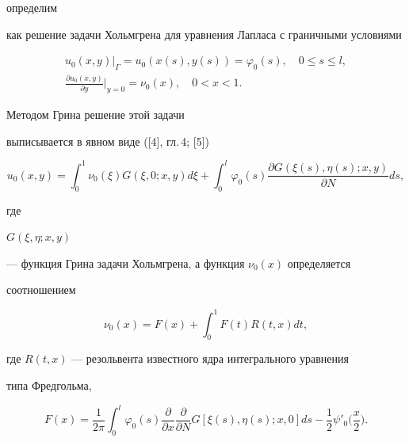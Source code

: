 определим


как решение задачи Хольмгрена для уравнения Лапласа с граничными условиями


\begin{gather*}


u_0(x,y)\big|_\Gamma=u_0(x(s),y(s))=


\varphi_0(s),\quad 0\le s\le l, \\


%


\frac {\partial u_0(x,y)}{\partial y}\bigg|_{y=0}


=\nu_0(x),\quad 0<x<1.


\end{gather*}


Методом Грина решение этой задачи


выписывается в явном виде ([4], гл.\,4; [5])


\begin{equation}


u_0(x,y)=\int_0^1\nu_0(\xi )G(\xi,0;x,y)d\xi +


\int_0^l\varphi_0(s)


\frac {\partial G(\xi (s),\eta (s);x,y)}{\partial N}ds,


\end{equation}


где


$G(\xi ,\eta ;x,y)$


--- функция Грина задачи Хольмгрена, а функция $\nu_0(x)$ определяется


соотношением


\begin{equation}


\nu_0(x)=F(x)+\int_0^1F(t)R(t,x)dt,


\end{equation}


где $R(t,x)$ --- резольвента известного ядра интегрального уравнения


типа Фредгольма,


\begin{equation}


F(x)=\frac {1}{2\pi }\int_0^l \varphi_0(s)\frac {\partial }


{\partial x}\frac {\partial }


{\partial N}G[\xi (s),\eta (s);x,0]ds-


\frac {1}{2}\psi '_0\bigg(\frac {x}{2}\bigg).


\end{equation}


